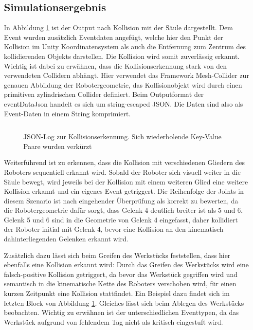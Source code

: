 \subsection{Simulationsergebnis}

In Abbildung \ref{listing:collisiondetectionerror} ist der Output nach Kollision
mit der Säule dargestellt. Dem Event wurden zusätzlich Eventdaten angefügt,
welche hier den Punkt der Kollision im Unity Koordinatensystem als auch die
Entfernung zum Zentrum des kollidierenden Objekts darstellen. Die Kollision wird
somit zuverlässig erkannt. Wichtig ist dabei zu erwähnen, dass die
Kollisionserkennung stark von den verwendeten Collidern abhängt. Hier verwendet
das Framework Mesh-Collider zur genauen Abbildung der Robotergeometrie, das
Kollisionobjekt wird durch einen primitiven zylindrischen Collider definiert.
Beim Outputformat der eventDataJson handelt es sich um string-escaped JSON. Die
Daten sind also als Event-Daten in einem String komprimiert.\\

\begin{figure}[H]
  \inputminted[fontsize=\footnotesize]{json}{code-snippets/collisiondetection.json}
  \caption{JSON-Log zur Kollisionserkennung. Sich wiederholende
    Key-Value Paare wurden
  verkürzt}
  \label{listing:collisiondetectionerror}
\end{figure}

Weiterführend ist zu erkennen, dass die Kollision mit verschiedenen Gliedern des
Roboters sequentiell erkannt wird. Sobald der Roboter sich visuell weiter in die
Säule bewegt, wird jeweils bei der Kollision mit einem weiteren Glied eine
weitere Kollision erkannt und ein eigenes Event getriggert. Die Reihenfolge der
Joints in diesem Szenario ist nach eingehender Überprüfung als korrekt zu
bewerten, da die Robotergeometrie dafür sorgt, dass Gelenk 4 deutlich breiter
ist als 5 und 6. Gelenk 5 und 6 sind in die Geometrie von Gelenk 4 eingefasst,
daher kollidiert der Roboter initial mit Gelenk 4, bevor eine Kollision an den
kinematisch dahinterliegenden Gelenken erkannt wird.

Zusätzlich dazu lässt sich beim Greifen des Werkstücks feststellen, dass
hier ebenfalls eine Kollision erkannt wird: Durch das Greifen des
Werkstücks wird
eine falsch-positive Kollision getriggert, da bevor das Werkstück gegriffen wird
und semantisch in die kinematische Kette des Roboters verschoben wird, für einen
kurzen Zeitpunkt eine Kollision stattfindet. Ein Beispiel dazu findet sich im
letzten Block von Abbildung \ref{listing:collisiondetectionerror}. Gleiches
lässt sich beim Ablegen des Werkstücks beobachten. Wichtig zu
erwähnen ist der unterschiedlichen Eventtypen, da das Werkstück
aufgrund von fehlendem Tag nicht
als kritisch eingestuft wird.

